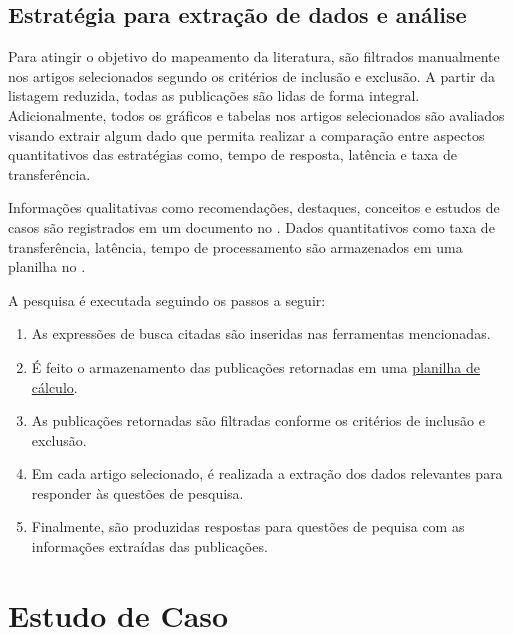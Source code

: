 \subsection{Estratégia para extração de dados e análise}
Para atingir o objetivo do mapeamento da literatura, são filtrados manualmente nos artigos selecionados segundo os critérios de inclusão e exclusão. A partir da listagem reduzida, todas as publicações são lidas de forma integral.
Adicionalmente, todos os gráficos e tabelas nos artigos selecionados são avaliados visando extrair algum dado que permita realizar a comparação entre aspectos quantitativos das estratégias como, tempo de resposta, latência e taxa de transferência.

Informações qualitativas como recomendações, destaques, conceitos e estudos de casos são registrados em um documento no . Dados quantitativos como taxa de transferência, latência, tempo de processamento são armazenados em uma planilha no . 

A pesquisa é executada seguindo os passos a seguir:
\begin{enumerate}
    \item As expressões de busca citadas são inseridas nas ferramentas mencionadas.
    \item É feito o armazenamento das publicações retornadas em uma \href{https://docs.google.com/spreadsheets/d/1rtH8Jl1EHguqZ4Py2mgV3pab7IQzt72-Sv2S1jPzLsQ/edit?usp=sharing}{planilha de cálculo}.
    \item As publicações retornadas são filtradas conforme os critérios de inclusão e exclusão.
    \item Em cada artigo selecionado, é realizada a extração dos dados relevantes para responder às questões de pesquisa.
    \item Finalmente, são produzidas respostas para questões de pequisa com as informações extraídas das publicações.
\end{enumerate}

\section{Estudo de Caso}


